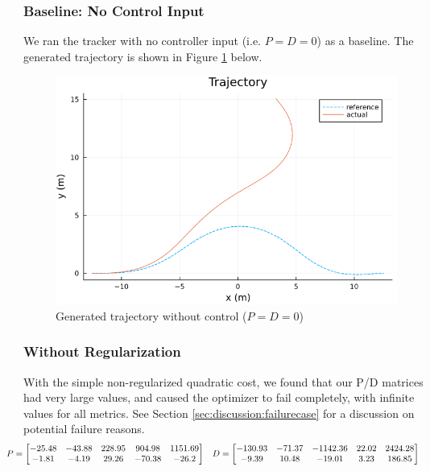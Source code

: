 \documentclass[11pt]{article}
\begin{document}
    \def\quadcost{\ensuremath{\mathcal{L}_Q}}
    \def\rmsepos{\ensuremath{\mathrm{RMSE}_{\mathrm{pos}}}}
    \def\rmseorient{\ensuremath{\mathrm{RMSE}_{\mathrm{orient}}}}

    \subsubsection{Baseline: No Control Input}
    We ran the tracker with no controller input (i.e. $P = D = 0$) as a baseline. The generated trajectory is shown in Figure \ref{fig:trajectorynocontrol} below.
    
    \begin{figure}[h!]
        \centering
        \includegraphics[width=0.6\linewidth]{img/trajectory_nocontrol}
        \caption{Generated trajectory without control ($ P = D = 0$)}
        \label{fig:trajectorynocontrol}
    \end{figure}

    \subsubsection{Without Regularization} \label{sec:results:singletraj:noreg}
    With the simple non-regularized quadratic cost, we found that our P/D matrices had very large values, and caused the optimizer to fail completely, with infinite values for all metrics. See Section \ref{sec:discussion:failurecase} for a discussion on potential failure reasons.
        \begin{align*}
            \hspace{-2em}
            P &= \bmat{-25.48 & -43.88 & 228.95 & 904.98 & 1151.69 \\
                -1.81 & -4.19 & 29.26 & -70.38 & -26.2} & 
            D &
            = \bmat{-130.93 & -71.37 & -1142.36 & 22.02 & 2424.28 \\
                -9.39 & 10.48  & -19.01 & 3.23 & 186.85}
        \end{align*}
    
\end{document}
